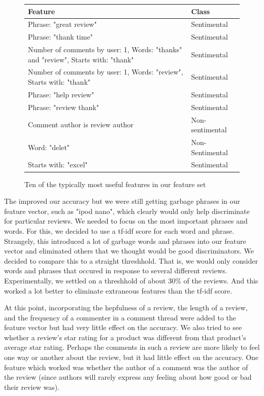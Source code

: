 \documentclass[]{report}
\begin{document}
\begin{figure}
	\begin{center}
	\begin{tabular}{ p{7 cm} | p{3 cm} }
			Feature& 
			Class     \\
			\hline
			\hline
			Phrase: "great review" & Sentimental  \\
			\hline
			Phrase: "thank time" & Sentimental  \\
			\hline
			Number of comments by user: 1, Words: "thanks" and "review", Starts with: "thank" & Sentimental \\
			\hline
			Number of comments by user: 1, Words: "review", Starts with: "thank" & Sentimental \\
			\hline
			Phrase: "help review" & Sentimental  \\
			\hline
			Phrase: "review thank" & Sentimental  \\
			\hline
			Comment author is review author & Non-sentimental  \\
			\hline
			Word: "delet" & Non-Sentimental  \\
			\hline
			Starts with: "excel" & Sentimental  \\
			\hline
		\end{tabular}
	\end{center}
	\caption{Ten of the typically most useful features in our feature set}
	\label{figBestFeatures}
\end{figure}


The improved our accuracy but we were still getting garbage phrases in our feature vector, such as "ipod nano", which clearly would only help discriminate for particular reviews.  We needed to focus on the most important phrases and words.  For this, we decided to use a tf-idf score for each word and phrase.  Strangely, this introduced a lot of garbage words and phrases into our feature vector and eliminated others that we thought would be good discriminators.  We decided to compare this to a straight threshhold.  That is, we would only consider words and phrases that occured in response to several different reviews.  Experimentally, we settled on a threshhold of about 30\% of the reviews.  And this worked a lot better to eliminate extraneous features than the tf-idf score.

At this point, incorporating the hepfulness of a review, the length of a review, and the frequency of a commenter in a comment thread were added to the feature vector but had very little effect on the accuracy.  We also tried to see whether a review's star rating for a product was different from that product's average star rating.  Perhaps the comments in such a review are more likely to feel one way or another about the review, but it had little effect on the accuracy. One feature which worked was whether the author of a comment was the author of the review (since authors will rarely express any feeling about how good or bad their review was).
\end{document}
